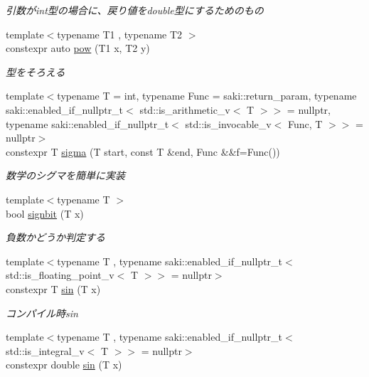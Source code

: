 \begin{DoxyCompactItemize}
\begin{DoxyCompactList}\small\item\em 引数がint型の場合に、戻り値をdouble型にするためのもの \end{DoxyCompactList}\item 
{\footnotesize template$<$typename T1 , typename T2 $>$ }\\constexpr auto \mbox{\hyperlink{namespacesaki_aede1168d9c20adf475c0a27670925c34}{pow}} (T1 x, T2 y)
\begin{DoxyCompactList}\small\item\em 型をそろえる \end{DoxyCompactList}\item 
{\footnotesize template$<$typename T  = int, typename Func  = saki\+::return\+\_\+param, typename saki\+::enabled\+\_\+if\+\_\+nullptr\+\_\+t$<$ std\+::is\+\_\+arithmetic\+\_\+v$<$ T $>$$>$  = nullptr, typename saki\+::enabled\+\_\+if\+\_\+nullptr\+\_\+t$<$ std\+::is\+\_\+invocable\+\_\+v$<$ Func, T $>$$>$  = nullptr$>$ }\\constexpr T \mbox{\hyperlink{namespacesaki_ae518b81f2ab4bba826a913a430a0716f}{sigma}} (T start, const T \&end, Func \&\&f=Func())
\begin{DoxyCompactList}\small\item\em 数学のシグマを簡単に実装 \end{DoxyCompactList}\item 
{\footnotesize template$<$typename T $>$ }\\bool \mbox{\hyperlink{namespacesaki_a5ed78463ed5808788e1b77eeecd9352a}{signbit}} (T x)
\begin{DoxyCompactList}\small\item\em 負数かどうか判定する \end{DoxyCompactList}\item 
{\footnotesize template$<$typename T , typename saki\+::enabled\+\_\+if\+\_\+nullptr\+\_\+t$<$ std\+::is\+\_\+floating\+\_\+point\+\_\+v$<$ T $>$$>$  = nullptr$>$ }\\constexpr T \mbox{\hyperlink{namespacesaki_a743f7284cdebb6406db9b37e42bcd730}{sin}} (T x)
\begin{DoxyCompactList}\small\item\em コンパイル時sin \end{DoxyCompactList}\item 
{\footnotesize template$<$typename T , typename saki\+::enabled\+\_\+if\+\_\+nullptr\+\_\+t$<$ std\+::is\+\_\+integral\+\_\+v$<$ T $>$$>$  = nullptr$>$ }\\constexpr double \mbox{\hyperlink{namespacesaki_a9fd77d1e52189e28f4a5d069891501cf}{sin}} (T x)

\end{DoxyCompactItemize}
